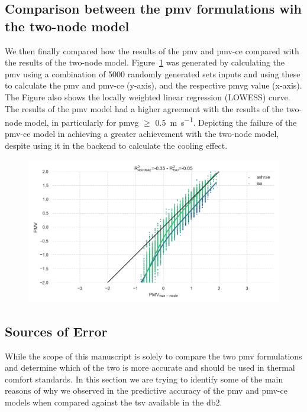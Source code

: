 \subsection{Comparison between the \ac{pmv} formulations wih the two-node model}\label{subsec:comparison-between-the-ac{pmv}-formulations-wih-the-two-node-model}
We then finally compared how the results of the \ac{pmv} and \gls{pmv-ce} compared with the results of the two-node model.
Figure~\ref{fig:pmv_two_node_comparison} was generated by calculating the \ac{pmv} using a combination of 5000 randomly generated sets inputs and using these to calculate the \ac{pmv} and \gls{pmv-ce} (y-axis), and the respective \gls{pmvg} value (x-axis).
The Figure also shows the locally weighted linear regression (LOWESS) curve.
The results of the \ac{pmv} model had a higher agreement with the results of the two-node model, in particularly for \gls{pmvg} $\geq$ \qty{0.5}{\m\per\s}.
Depicting the failure of the \gls{pmv-ce} model in achieving a greater achievement with the two-node model, despite using it in the backend to calculate the cooling effect.
\begin{figure}[htb!]
    \centering
    \includegraphics[width=\textwidth]{figures/pmv_two_node_comparison}
    \caption{}
    \label{fig:pmv_two_node_comparison}
\end{figure}

\subsection{Sources of Error}\label{sec:sources-of-error}
While the scope of this manuscript is solely to compare the two \ac{pmv} formulations and determine which of the two is more accurate and should be used in thermal comfort standards.
In this section we are trying to identify some of the main reasons of why we observed in the predictive accuracy of the \ac{pmv} and \gls{pmv-ce} models when compared against the \ac{tsv} available in the \gls{db2}.

